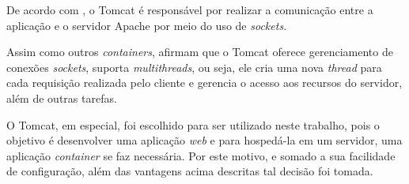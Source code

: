 \par De acordo com  , o Tomcat é responsável por realizar a comunicação entre a aplicação e o servidor Apache por meio do uso de \textit{sockets}.

\par Assim como outros \textit{containers},  afirmam que o Tomcat oferece gerenciamento de conexões \textit{sockets}, suporta \textit{multithreads}, ou seja, ele cria uma nova \textit{thread} para cada requisição realizada pelo cliente e gerencia o acesso aos recursos do servidor, além de outras tarefas.

\par O Tomcat, em especial, foi escolhido para ser utilizado neste trabalho, pois o objetivo é desenvolver uma aplicação \textit{web} e para hospedá-la em um servidor, uma aplicação \textit{container} se faz necessária. Por este motivo, e somado a sua facilidade de configuração, além das vantagens acima descritas tal decisão foi tomada.
